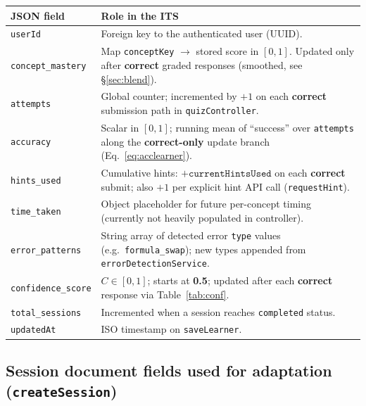 \documentclass[12pt,a4paper]{article}
\begin{document}
\renewcommand{\arraystretch}{1.4}
\noindent\begin{tabularx}{\linewidth}{@{}l >{\RaggedRight\arraybackslash}X@{}}
\toprule
\rowcolor{headerbg}
\color{white}\textbf{JSON field} & \color{white}\textbf{Role in the ITS} \\
\midrule
\texttt{userId} & Foreign key to the authenticated user (UUID). \\
\rowcolor{rowhighlight}
\texttt{concept\_mastery} & Map \texttt{conceptKey} $\rightarrow$ stored score in $[0,1]$. Updated only after \textbf{correct} graded responses (smoothed, see \S\ref{sec:blend}). \\
\texttt{attempts} & Global counter; incremented by $+1$ on each \textbf{correct} submission path in \texttt{quizController}. \\
\rowcolor{rowhighlight}
\texttt{accuracy} & Scalar in $[0,1]$; running mean of ``success'' over \texttt{attempts} along the \textbf{correct-only} update branch (Eq.~\ref{eq:acclearner}). \\
\texttt{hints\_used} & Cumulative hints: $+\texttt{currentHintsUsed}$ on each \textbf{correct} submit; also $+1$ per explicit hint API call (\texttt{requestHint}). \\
\rowcolor{rowhighlight}
\texttt{time\_taken} & Object placeholder for future per-concept timing (currently not heavily populated in controller). \\
\texttt{error\_patterns} & String array of detected error \texttt{type} values (e.g.\ \texttt{formula\_swap}); new types appended from \texttt{errorDetectionService}. \\
\rowcolor{rowhighlight}
\texttt{confidence\_score} & $C \in [0,1]$; starts at \textbf{0.5}; updated after each \textbf{correct} response via Table~\ref{tab:conf}. \\
\texttt{total\_sessions} & Incremented when a session reaches \texttt{completed} status. \\
\rowcolor{rowhighlight}
\texttt{updatedAt} & ISO timestamp on \texttt{saveLearner}. \\
\bottomrule
\end{tabularx}

\subsection{Session document fields used for adaptation (\texttt{createSession})}
\end{document}
